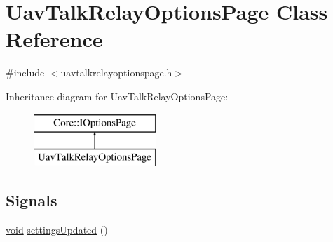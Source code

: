 \hypertarget{class_uav_talk_relay_options_page}{\section{\-Uav\-Talk\-Relay\-Options\-Page \-Class \-Reference}
\label{class_uav_talk_relay_options_page}
}


{\ttfamily \#include $<$uavtalkrelayoptionspage.\-h$>$}

\-Inheritance diagram for \-Uav\-Talk\-Relay\-Options\-Page\-:\begin{figure}[H]
\begin{center}
\leavevmode
\includegraphics[height=2.000000cm]{class_uav_talk_relay_options_page}
\end{center}
\end{figure}
\subsection*{\-Signals}
\begin{DoxyCompactItemize}
\item 
\hyperlink{group___u_a_v_objects_plugin_ga444cf2ff3f0ecbe028adce838d373f5c}{void} \hyperlink{group___u_a_v_talk_gace88a60fb10cfb6c3994f0a3a8883aa3}{settings\-Updated} ()
\end{DoxyCompactItemize}
